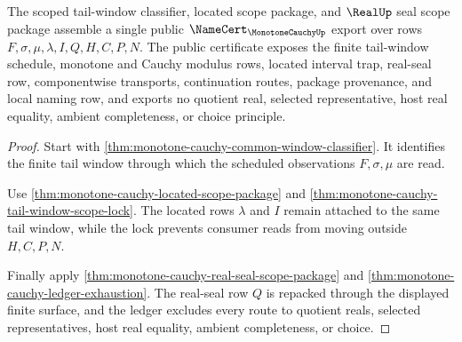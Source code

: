 \begin{theorem}
\label{thm:monotone-cauchy-public-tail-window-certificate}
The scoped tail-window classifier, located scope package, and $\RealUp$ seal scope package assemble a single public $\NameCert_{\MonotoneCauchyUp}$ export over rows $F,\sigma,\mu,\lambda,I,Q,H,C,P,N$. The public certificate exposes the finite tail-window schedule, monotone and Cauchy modulus rows, located interval trap, real-seal row, componentwise transports, continuation routes, package provenance, and local naming row, and exports no quotient real, selected representative, host real equality, ambient completeness, or choice principle.
\end{theorem}
\begin{proof}
Start with \autoref{thm:monotone-cauchy-common-window-classifier}. It identifies the finite tail window through which the scheduled observations $F,\sigma,\mu$ are read.

Use \autoref{thm:monotone-cauchy-located-scope-package} and \autoref{thm:monotone-cauchy-tail-window-scope-lock}. The located rows $\lambda$ and $I$ remain attached to the same tail window, while the lock prevents consumer reads from moving outside $H,C,P,N$.

Finally apply \autoref{thm:monotone-cauchy-real-seal-scope-package} and \autoref{thm:monotone-cauchy-ledger-exhaustion}. The real-seal row $Q$ is repacked through the displayed finite surface, and the ledger excludes every route to quotient reals, selected representatives, host real equality, ambient completeness, or choice.
\end{proof}

